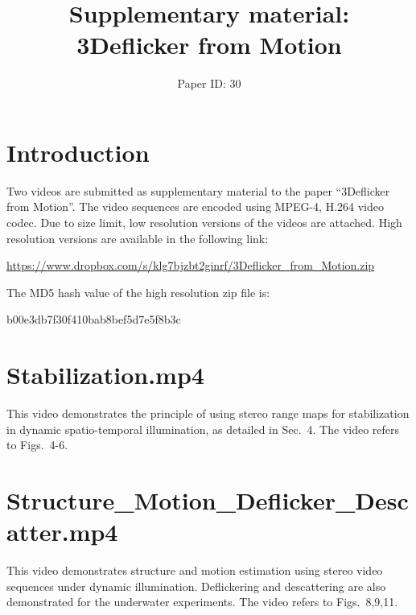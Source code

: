 \documentclass[a4paper]{article}
\begin{document}
\title{\vspace{-2cm}Supplementary material: \\3Deflicker from Motion}
\author{Paper ID: 30}
\date{}

\maketitle

\section{Introduction}

Two videos are submitted as supplementary material to the paper ``3Deflicker from Motion''. The video sequences are encoded using MPEG-4, H.264 video codec. Due to size limit, low resolution versions of the videos are attached. High resolution versions are available in the following link:\vspace{0.3cm}

\noindent\url{https://www.dropbox.com/s/klg7bjzbt2ginrf/3Deflicker_from_Motion.zip}\vspace{0.3cm}

\noindent The MD5 hash value of the high resolution zip file is:

b00e3db7f30f410bab8bef5d7e5f8b3c


\section{Stabilization.mp4}

This video demonstrates the principle of using stereo range maps for stabilization in dynamic spatio-temporal illumination, as detailed in Sec.~4. The video refers to Figs.~4-6.

\section{Structure\_Motion\_Deflicker\_Descatter.mp4}

This video demonstrates structure and motion estimation using stereo video sequences under dynamic illumination. Deflickering and descattering are also demonstrated for the underwater experiments. The video refers to Figs.~8,9,11.
\end{document}
